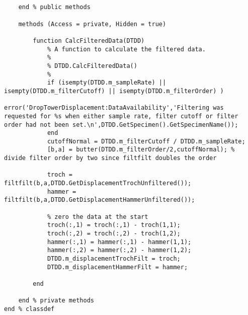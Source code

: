 \begin{lstlisting}
            
        
    end % public methods
    
    methods (Access = private, Hidden = true)
        
        function CalcFilteredData(DTDD)
            % A function to calculate the filtered data.
            %
            % DTDD.CalcFilteredData()
            %
            if (isempty(DTDD.m_sampleRate) || isempty(DTDD.m_filterCutoff) || isempty(DTDD.m_filterOrder) )
                error('DropTowerDisplacement:DataAvailability','Filtering was requested for %s when either sample rate, filter cutoff or filter order had not been set.\n',DTDD.GetSpecimen().GetSpecimenName());
            end
            cutoffNormal = DTDD.m_filterCutoff / DTDD.m_sampleRate;
            [b,a] = butter(DTDD.m_filterOrder/2,cutoffNormal); % divide filter order by two since filtfilt doubles the order
            
            troch = filtfilt(b,a,DTDD.GetDisplacementTrochUnfiltered());
            hammer = filtfilt(b,a,DTDD.GetDisplacementHammerUnfiltered());
            
            % zero the data at the start
            troch(:,1) = troch(:,1) - troch(1,1);
            troch(:,2) = troch(:,2) - troch(1,2);
            hammer(:,1) = hammer(:,1) - hammer(1,1);
            hammer(:,2) = hammer(:,2) - hammer(1,2);
            DTDD.m_displacementTrochFilt = troch;
            DTDD.m_displacementHammerFilt = hammer;
            
        end

    end % private methods
end % classdef
    
\end{lstlisting}
